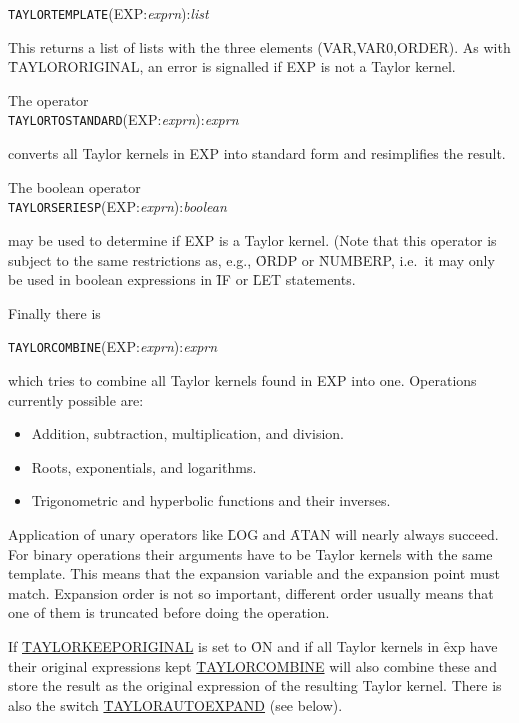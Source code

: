 \hypertarget{operator:TAYLORTEMPLATE}{}
\hspace*{2em} \texttt{TAYLORTEMPLATE}(EXP:{\em exprn}):{\em list}

This returns a list of lists with the three elements (VAR,VAR0,ORDER).
As with \f{TAYLORORIGINAL},
an error is signalled if EXP is not a Taylor kernel.

The operator
\hypertarget{operator:TAYLORTOSTANDARD}{}\\
\hspace*{2em} \texttt{TAYLORTOSTANDARD}(EXP:{\em exprn}):{\em exprn}

converts all Taylor kernels in EXP into standard form and
 resimplifies the result.

The boolean operator
\hypertarget{operator:TAYLORSERIESP}{}\\
\hspace*{2em} \texttt{TAYLORSERIESP}(EXP:{\em exprn}):{\em boolean}

may be used to determine if EXP is a Taylor kernel.
 (Note that this operator is subject to the same
restrictions as, e.g., \f{ORDP} or \f{NUMBERP}, i.e.\ it may only be used in
boolean expressions in \f{IF} or \f{LET} statements. 

Finally there is

\hypertarget{operator:TAYLORCOMBINE}{}
\hspace*{2em} \texttt{TAYLORCOMBINE}(EXP:{\em exprn}):{\em exprn}

which tries to combine all Taylor kernels found in EXP into one.
Operations currently possible are:
\begin{itemize}
  \item Addition, subtraction, multiplication, and division.
  \item Roots, exponentials, and logarithms.
  \item Trigonometric and hyperbolic functions and their inverses.
\end{itemize}
Application of unary operators like \f{LOG} and \f{ATAN} will
nearly always succeed. For binary operations their arguments have to be
Taylor kernels with the same template. This means that the expansion
variable and the expansion point must match. Expansion order is not so
important, different order usually means that one of them is truncated
before doing the operation.

 
If \hyperlink{switch:TAYLORKEEPORIGINAL}{\f{TAYLORKEEPORIGINAL}} is set to \f{ON} and if all Taylor
kernels in \f{exp} have their original expressions kept
\hyperlink{operator:TAYLORCOMBINE}{\f{TAYLORCOMBINE}} will also combine these and store the result
as the original expression of the resulting Taylor kernel.
There is also the switch \hyperlink{switch:TAYLORAUTOEXPAND}{\f{TAYLORAUTOEXPAND}} (see below).

